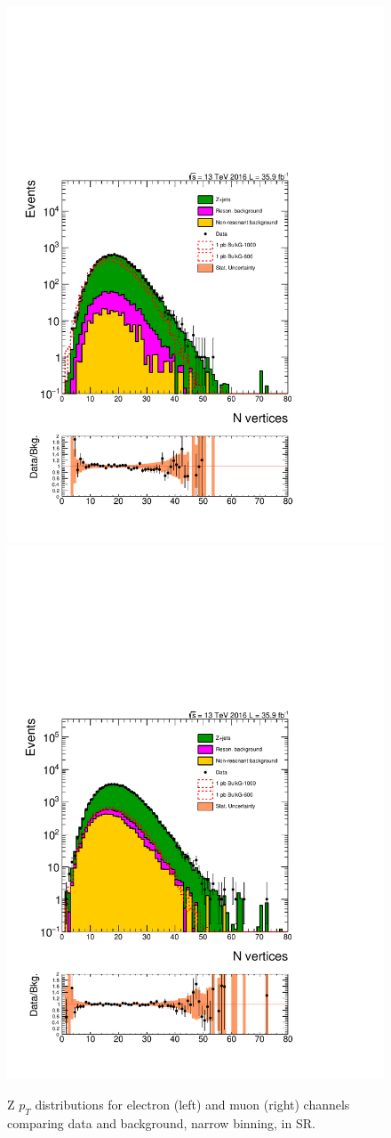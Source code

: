 \begin{figure}[htbp!]
\centering
\includegraphics[width=0.46\linewidth,page=10]{figures/ReMiniSummer16_DT_PhReMiniMCRcFixXsec_GMCPhPtWt_SRdPhiGT0p5_puWeightsummer16_muoneg_gjet_metfilter_unblind_el_log_1pb.pdf}
\includegraphics[width=0.46\linewidth,page=10]{figures/ReMiniSummer16_DT_PhReMiniMCRcFixXsec_GMCPhPtWt_SRdPhiGT0p5_puWeightsummer16_muoneg_gjet_metfilter_unblind_mu_log_1pb.pdf}
\caption{Z $p_T$ distributions for electron (left) and muon (right) channels
comparing data and background, 
narrow binning, in SR.}
\label{fig:SR_gjet_zpt_narrow}
\end{figure}

